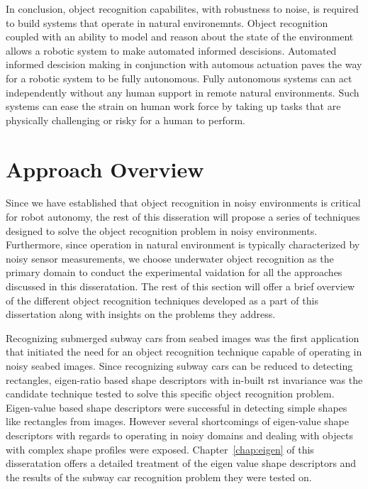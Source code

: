 \documentclass {udthesis}
\begin{document}
In conclusion, object recognition capabilites, with robustness to noise, is required to build systems that operate in natural environemnts. Object recognition coupled with an ability to model and reason about the state of the environment allows a robotic system to make automated informed descisions. Automated informed descision making in conjunction with automous actuation paves the way for a robotic system to be fully autonomous. Fully autonomous systems can act independently without any human support in remote natural environments. Such systems can ease the strain on human work force by taking up tasks that are physically challenging or risky for a human to perform.

\section{Approach Overview}

Since we have established that object recognition in noisy environments is critical for robot autonomy, the rest
of this disseration will propose a series of techniques designed to solve the object recognition problem in noisy environments.
Furthermore, since operation in natural environment is typically characterized by noisy sensor measurements, we choose
underwater object recognition as the primary domain to conduct the experimental vaidation for all the approaches discussed in this disseratation.
The rest of this section will offer a brief overview of the different object recognition techniques developed as a part of this 
dissertation along with insights on the problems they address.

Recognizing submerged subway cars from seabed images was the first application that initiated the need for 
an object recognition technique capable of operating in noisy seabed images. Since recognizing subway cars can be reduced 
to detecting rectangles, eigen-ratio based shape descriptors with in-built \gls{rst} invariance was the candidate technique tested
to solve this specific object recognition problem. Eigen-value based shape descriptors were successful in detecting 
simple shapes like rectangles from images.
However several shortcomings of eigen-value shape descriptors with regards to operating in noisy domains and dealing with objects with complex shape profiles were exposed. Chapter~\ref{chap:eigen} of this disseratation offers a detailed treatment of the eigen value shape descriptors and the results of the subway car recognition problem they were tested on.
\end{document}
